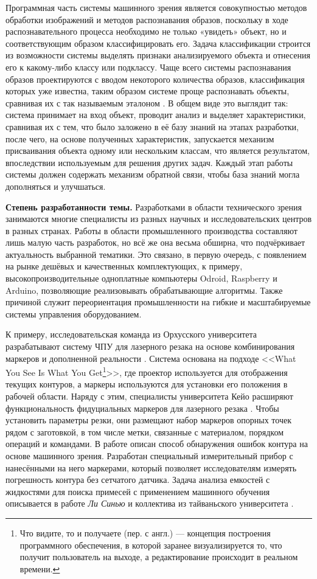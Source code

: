 Программная часть системы машинного зрения является совокупностью методов обработки изображений и методов распознавания образов, поскольку в ходе распознавательного процесса необходимо не только «увидеть» объект, но и соответствующим образом классифицировать его. Задача классификации строится из возможности системы выделять признаки анализируемого объекта и отнесения его к какому-либо классу или подклассу. Чаще всего системы распознавания образов проектируются с вводом некоторого количества образов, классификация которых уже известна, таким образом системе проще распознавать объекты, сравнивая их с так называемым эталоном \cite{Kudr-92, Mest2004}. В общем виде это выглядит так: система принимает на вход объект, проводит анализ и выделяет характеристики, сравнивая их с тем, что было заложено в её базу знаний на этапах разработки, после чего, на основе полученных характеристик, запускается механизм присваивания объекта одному или нескольким классам, что является результатом, впоследствии используемым для решения других задач. Каждый этап работы системы должен содержать механизм обратной связи, чтобы база знаний могла дополняться и улучшаться. 

\textbf{Степень разработанности темы.} Разработками в области технического зрения занимаются многие специалисты из разных научных и исследовательских центров в разных странах. Работы в области промышленного производства составляют лишь малую часть разработок, но всё же она весьма обширна, что подчёркивает актуальность выбранной тематики. Это связано, в первую очередь, с появлением на рынке дешёвых и качественных комплектующих, к примеру, высокопроизводительные одноплатные компьютеры Odroid, Raspberry и Arduino, позволяющие реализовывать обрабатывающие алгоритмы. Также причиной служит переориентация промышленности на гибкие и масштабируемые системы управления оборудованием.

К примеру, исследовательская команда из Орхусского университета разрабатывают систему ЧПУ для лазерного резака на основе комбинирования маркеров и дополненной реальности \cite{6935435}. Система основана на подходе <<What You See Is What You Get\footnote{Что видите, то и получаете (пер. с англ.) --- концепция построения программного обеспечения, в которой заранее визуализируется то, что получит пользователь на выходе, а редактирование происходит в реальном времени.}>>, где проектор используется для отображения текущих контуров, а маркеры используются для установки его положения в рабочей области. Наряду с этим, специалисты университета Кейо расширяют функциональность фидуциальных  маркеров для лазерного резака \cite{071ddc0cfd994362b7c96f0ecbc300f3}. Чтобы установить параметры резки, они размещают набор маркеров опорных точек рядом с заготовкой, в том числе метки, связанные с материалом, порядком операций и командами. В работе описан способ обнаружения ошибок контура на основе машинного зрения. Разработан специальный измерительный прибор с нанесёнными на него маркерами, который позволяет исследователям измерять погрешность контура без сетчатого датчика. Задача анализа емкостей с жидкостями для поиска примесей с применением машинного обучения описывается в работе \textit{Ли Синью} и коллектива из тайваньского университета \cite{Li2018}.


